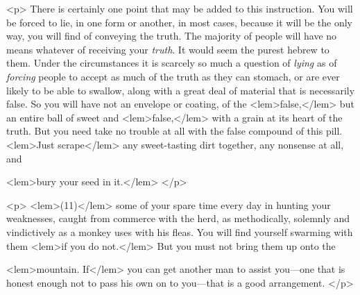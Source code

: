 {{				<p>
				There is certainly one point that may be added to this instruction. You will be forced 
				to lie, in one form or another, in most cases, because it will be the only way, you 
				will find of conveying the truth. The majority of people will have no means whatever 
				of receiving your \emph{truth}. It would seem the purest hebrew to them. Under the circumstances 
				it is scarcely so much a question of \emph{lying} as of \emph{forcing} people to accept as much of 
				the truth as they can stomach, or are ever likely to be able to swallow, along with 
				a great deal of material that is necessarily false. So you will have not an envelope 
				or coating, of the 
<lem>false,</lem>
					{} 
				but an entire ball of sweet and 
<lem>false,</lem>
					{} 
				with a grain at its 
				heart of the truth. But you need take no trouble at all with the false compound 
				of this pill. 
<lem>Just scrape</lem>
					{} 
				any sweet-tasting dirt together, any nonsense at all, and 
				
<lem>bury your seed in it.</lem>{%
				}
				</p> 

				<p>
				\vspace{10pt}
\noindent
<lem>(11)</lem>{}\hspace{20pt}  
					{}
				some of your spare time every 
				day in hunting your weaknesses, caught from commerce with the herd, as methodically, 
				solemnly and vindictively as a monkey uses with his fleas. You will find 
				yourself swarming with them 
<lem>if you do not.</lem> 
					{}
				But you must not bring them up onto the 
				
<lem>mountain. If</lem> 
					{}
				you can get another man to assist you---one that is honest enough 
				not to pass his own on to you---that is a good arrangement. 
 				</p> 

}}
